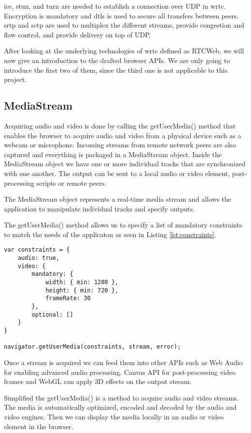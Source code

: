 \gls{ice}, \gls{stun}, and \gls{turn} are needed to establish a connection over UDP in \gls{wrtc}. Encryption is mandatory and \gls{dtls} is used to secure all transfers between peers. \gls{srtp} and \gls{sctp} are used to multiplex the different streams, provide congestion and flow control, and provide delivery on top of UDP.

After looking at the underlying technologies of \gls{wrtc} defined as RTCWeb, we will now give an introduction to the drafted browser APIs. We are only going to introduce the first two of them, since the third one is not applicable to this project.

\subsection{MediaStream}
Acquiring audio and video is done by calling the getUserMedia() method that enables the browser to acquire audio and video from a physical device such as a webcam or microphone. Incoming streams from remote network peers are also captured and everything is packaged in a MediaStream object. Inside the MediaStream object we have one or more individual tracks that are synchronized with one another. The output can be sent to a local audio or video element, post-processing scripts or remote peers.

The MediaStream object represents a real-time media stream and allows the application to manipulate individual tracks and specify outputs.

The getUserMedia() method allows us to specify a list of mandatory constraints to match the needs of the applicaton as seen in Listing \ref{lst:constraints}.

\lstset{language=Javascript} 
\begin{lstlisting}[caption={getUserMedia constraints object}, label={lst:constraints}]
var constraints = {
	audio: true,
	video: {
		mandatory: {
			width: { min: 1280 },
			height: { min: 720 },
			frameRate: 30
		},
		optional: []
	}
}

navigator.getUserMedia(constraints, stream, error);
\end{lstlisting}

Once a stream is acquired we can feed them into other APIs such as Web Audio for enabling advanced audio processing. Canvas API for post-processing video frames and WebGL can apply 3D effects on the output stream.

Simplified the getUserMedia() is a method to acquire audio and video streams. The media is automatically optimized, encoded and decoded by the audio and video engines. Then we can display the media locally in an audio or video element in the browser.


